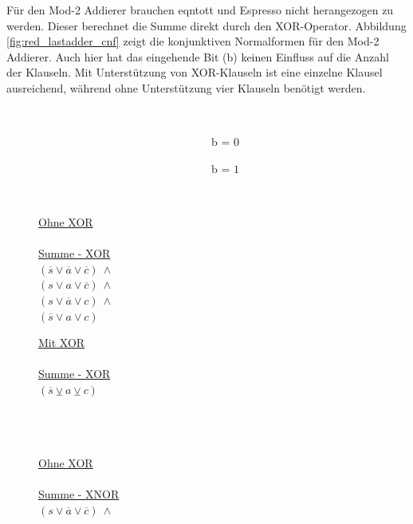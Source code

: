 Für den Mod-2 Addierer brauchen eqntott und Espresso nicht herangezogen zu werden. Dieser berechnet die Summe direkt durch den XOR-Operator.
Abbildung \ref{fig:red_lastadder_cnf} zeigt die konjunktiven Normalformen für den Mod-2 Addierer. Auch hier hat das eingehende Bit (b)
keinen Einfluss auf die Anzahl der Klauseln. Mit Unterstützung von XOR-Klauseln ist eine einzelne Klausel ausreichend, während ohne
Unterstützung vier Klauseln benötigt werden.
\begin{figure}[!h]
  \centering
  \begin{minipage}[c]{0.3cm}
    ~
  \end{minipage}
  \begin{minipage}[c]{7.1cm}
    ~~~~~~~~~~~~~~~~~~~~~~~~~~~~~~~b = $0$
  \end{minipage}
  \begin{minipage}[c]{7cm}
    ~~~~~~~~~~~~~~~~~~~~~~~~~~~~~~~b = $1$
  \end{minipage}
  \begin{minipage}[l]{0.4cm}
    ~
  \end{minipage}
  \begin{minipage}[l]{3.5cm}
    \underline{Ohne XOR}\\
    ~\\
    \underline{Summe - XOR}\\
    $ (\overline{s} \vee \overline{a} \vee \overline{c}) ~ \wedge $\\
    $ (s \vee a \vee \overline{c}) ~ \wedge $\\
    $ (s \vee \overline{a} \vee c) ~ \wedge $\\
    $ (\overline{s} \vee a \vee c) $
  \end{minipage}
  \begin{minipage}[l]{3.5cm}
    \underline{Mit XOR}\\
    ~\\
    \underline{Summe - XOR}\\
    $ (\overline{s} \veebar a \veebar c) $\\
    ~\\
    ~\\
    ~
  \end{minipage}
  \begin{minipage}[l]{3.5cm}
    \underline{Ohne XOR}\\
    ~\\
    \underline{Summe - XNOR}\\
    $ (s \vee \overline{a} \vee \overline{c}) ~ \wedge $\\

\end{minipage}
\end{figure}
